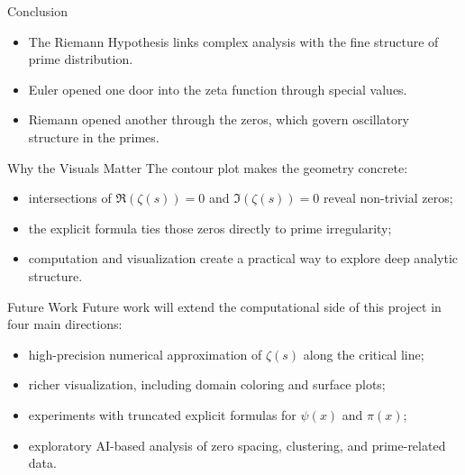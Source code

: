 \documentclass[aspectratio=43]{beamer}
\begin{document}
\begin{frame}{Conclusion}
\begin{itemize}
\item The Riemann Hypothesis links complex analysis with the fine structure of prime distribution.
\item Euler opened one door into the zeta function through special values.
\item Riemann opened another through the zeros, which govern oscillatory structure in the primes.
\end{itemize}
\end{frame}

\begin{frame}{Why the Visuals Matter}
The contour plot makes the geometry concrete:
\begin{itemize}
\item intersections of $\Re(\zeta(s))=0$ and $\Im(\zeta(s))=0$ reveal non-trivial zeros;
\item the explicit formula ties those zeros directly to prime irregularity;
\item computation and visualization create a practical way to explore deep analytic structure.
\end{itemize}
\end{frame}

\begin{frame}{Future Work}
Future work will extend the computational side of this project in four main directions:
\begin{itemize}
    \item high-precision numerical approximation of $\zeta(s)$ along the critical line;
    \item richer visualization, including domain coloring and surface plots;
    \item experiments with truncated explicit formulas for $\psi(x)$ and $\pi(x)$;
    \item exploratory AI-based analysis of zero spacing, clustering, and prime-related data.
\end{itemize}
\end{frame}
\end{document}
